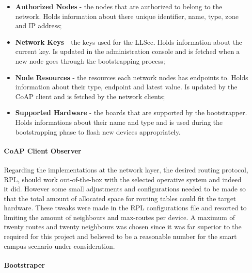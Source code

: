 \begin{itemize}
  \item \textbf{Authorized Nodes} - the nodes that are authorized to belong to the network. Holds information about there unique identifier, name, type, zone and IP address;
  \item \textbf{Network Keys} - the keys used for the \gls{LLSec}. Holds information about the current key. Is updated in the administration console and is fetched when a new node goes through the bootstrapping process;
  \item \textbf{Node Resources} - the resources each network nodes has endpoints to. Holds information about their type, endpoint and latest value. Is updated by the \gls{CoAP} client and is fetched by the network clients;
  \item \textbf{Supported Hardware} - the boards that are supported by the bootstrapper. Holds informations about their name and type and is used during the bootstrapping phase to flash new devices appropriately.
\end{itemize}


\paragraph{\textbf{CoAP Client Observer}}
\paragraph{}

Regarding the implementations at the network layer, the desired routing protocol, \gls{RPL}, should work out-of-the-box with the selected operative system and indeed it did. However some small adjustments and configurations needed to be made so that the total amount of allocated space for routing tables could fit the target hardware. These tweaks were made in the \gls{RPL} configurations file and resorted to limiting the amount of neighbours and max-routes per device. A maximum of twenty routes and twenty neighbours was chosen since it was far superior to the required for this project and believed to be a reasonable number for the smart campus scenario under consideration.

\paragraph{\textbf{Bootstraper}}
\paragraph{}


